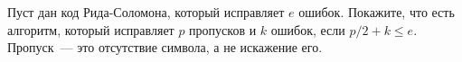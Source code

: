 Пуст дан код Рида-Соломона, который исправляет $e$ ошибок. Покажите, что есть алгоритм, который исправляет $p$ пропусков и
$k$ ошибок, если $p / 2 + k \le e$. Пропуск~--- это отсутствие символа, а не искажение его.